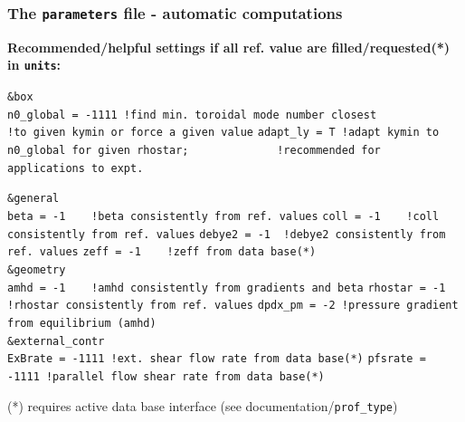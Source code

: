 \documentclass[9pt]{beamer}
\begin{document}
\begin{frame}[fragile]
  \frametitle{The {\tt parameters} file - automatic computations}

\begin{block}{\bf Recommended/helpful settings if all ref. value are filled/requested(*) in {\tt units}:}

\begin{block}

\verb|&box|\\
\verb|n0_global = -1111 !find min. toroidal mode number closest|
\verb|                  !to given kymin or force a given value|
\verb|adapt_ly = T !adapt kymin to n0_global for given rhostar;|
\verb|             !recommended for applications to expt.|

\verb|&general|\\
\verb|beta = -1    !beta consistently from ref. values|
\verb|coll = -1    !coll consistently from ref. values|
\verb|debye2 = -1  !debye2 consistently from ref. values|
\verb|zeff = -1    !zeff from data base(*)|\\[1ex]

\verb|&geometry|\\
\verb|amhd = -1    !amhd consistently from gradients and beta|
\verb|rhostar = -1 !rhostar consistently from ref. values|
\verb|dpdx_pm = -2 !pressure gradient from equilibrium (amhd)|\\[1ex]

\verb|&external_contr|\\
\verb|ExBrate = -1111 !ext. shear flow rate from data base(*)|
\verb|pfsrate = -1111 !parallel flow shear rate from data base(*)|

\end{block}
(*) requires active data base interface (see documentation/{\tt prof\_type})
\end{block}


\end{frame}

\end{document}
